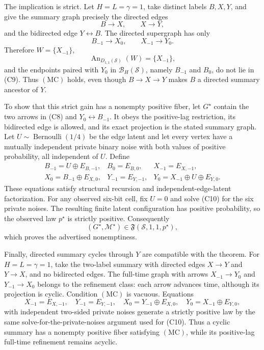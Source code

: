 The implication is strict.  Let \(H=L=\gamma=1\), take distinct labels \(B,X,Y\), and give the summary graph precisely the directed edges
\[
B\to X,
\qquad
X\to Y,
\tag{C7}
\]
and the bidirected edge \(Y\leftrightarrow B\).  The directed supergraph has only
\[
B_{-1}\to X_0,
\qquad
X_{-1}\to Y_0.
\tag{C8}
\]
Therefore \(W=\{X_{-1}\}\),
\[
\operatorname{An}_{D_{1,1}(\mathcal S)}(W)=\{X_{-1}\},
\tag{C9}
\]
and the endpoints paired with \(Y_0\) in \(\mathcal B_H(\mathcal S)\), namely \(B_{-1}\) and \(B_0\), do not lie in (C9).  Thus \(\mathrm{(MC)}\) holds, even though \(B\to X\to Y\) makes \(B\) a directed summary ancestor of \(Y\).

To show that this strict gain has a nonempty positive fiber, let \(G^{\star}\) contain the two arrows in (C8) and \(Y_0\leftrightarrow B_{-1}\).  It obeys the positive-lag restriction, its bidirected edge is allowed, and its exact projection is the stated summary graph.  Let \(U\sim\operatorname{Bernoulli}(1/4)\) be the edge latent and let every vertex have a mutually independent private binary noise with both values of positive probability, all independent of \(U\).  Define
\[
\begin{array}{lll}
B_{-1}=U\mathbin\oplus E_{B,-1},
&B_0=E_{B,0},
&X_{-1}=E_{X,-1},\\
X_0=B_{-1}\mathbin\oplus E_{X,0},
&Y_{-1}=E_{Y,-1},
&Y_0=X_{-1}\mathbin\oplus U\mathbin\oplus E_{Y,0}.
\end{array}
\tag{C10}
\]
These equations satisfy structural recursion and independent-edge-latent factorization.  For any observed six-bit cell, fix \(U=0\) and solve (C10) for the six private noises.  The resulting finite latent configuration has positive probability, so the observed law \(p^{\star}\) is strictly positive.  Consequently
\[
(G^{\star},\mathcal M^{\star})\in\mathfrak F(\mathcal S,1,1,p^{\star}),
\tag{C11}
\]
which proves the advertised nonemptiness.

Finally, directed summary cycles through \(Y\) are compatible with the theorem.  For \(H=L=\gamma=1\), take the two-label summary with directed edges \(X\to Y\) and \(Y\to X\), and no bidirected edges.  The full-time graph with arrows \(X_{-1}\to Y_0\) and \(Y_{-1}\to X_0\) belongs to the refinement class: each arrow advances time, although its projection is cyclic.  Condition \(\mathrm{(MC)}\) is vacuous.  Equations
\[
X_{-1}=E_{X,-1},
\quad
Y_{-1}=E_{Y,-1},
\quad
X_0=Y_{-1}\mathbin\oplus E_{X,0},
\quad
Y_0=X_{-1}\mathbin\oplus E_{Y,0},
\tag{C12}
\]
with independent two-sided private noises generate a strictly positive law by the same solve-for-the-private-noises argument used for (C10).  Thus a cyclic summary has a nonempty positive fiber satisfying \(\mathrm{(MC)}\), while its positive-lag full-time refinement remains acyclic.
